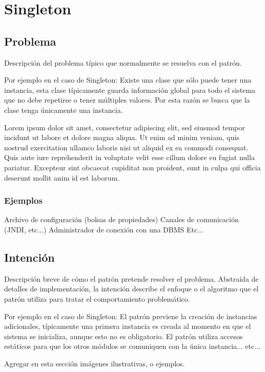 \documentclass[12pt]{book}
\begin{document}
\section{Singleton}

\subsection{Problema}

Descripción del problema típico que normalmente se resuelva con el patrón. 

Por ejemplo en el caso de Singleton:
Existe una clase que sólo puede tener una instancia, esta clase típicamente guarda información global para todo el sistema que no debe repetirse o tener múltiples valores. Por esta razón se busca que la clase tenga únicamente una instancia.

Lorem ipsum dolor sit amet, consectetur adipiscing elit, sed eiusmod tempor incidunt ut labore et dolore magna aliqua. Ut enim ad minim veniam, quis nostrud exercitation ullamco laboris nisi ut aliquid ex ea commodi consequat. Quis aute iure reprehenderit in voluptate velit esse cillum dolore eu fugiat nulla pariatur. Excepteur sint obcaecat cupiditat non proident, sunt in culpa qui officia deserunt mollit anim id est laborum.


\subsubsection{Ejemplos}
Archivo de configuración (bolsas de propiedades)
Canales de comunicación (JNDI, etc...)
Administrador de conexión con una DBMS
Etc...

\subsection{Intención}

Descripción breve de cómo el patrón pretende resolver el problema. Abstraída de detalles de implementación, la intención describe el enfoque o el algoritmo que el patrón utiliza para tratar el comportamiento problemático.

Por ejemplo en el caso de Singleton:
El patrón previene la creación de instancias adicionales, típicamente una primera instancia es creada al momento en que el sistema se inicializa, aunque esto no es obligatorio. El patrón utiliza accesos estáticos para que los otros módulos se comuniquen con la única instancia... etc...

Agregar en esta sección imágenes ilustrativas, o ejemplos.
\end{document}
